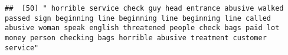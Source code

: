 \documentclass[
]{article}
\begin{document}
\begin{verbatim}
##  [50] " horrible service check guy head entrance abusive walked passed sign beginning line beginning line beginning line called abusive woman speak english threatened people check bags paid lot money person checking bags horrible abusive treatment customer service"                                                                                                                                                                                                                                                                                                                                                                                                                                                                                                                                                                                                                                                                                                                                                                                                                                                                                                                                                                                                                                                                                                                                                                                                                                                                                                                                                                                                                                                                                                                             

\end{verbatim}
\end{document}
